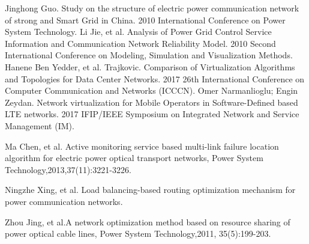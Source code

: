 \documentclass[AMA,STIX1COL]{WileyNJD-v2}
\begin{document}
\begin{thebibliography}{1}
Jinghong Guo. Study on the structure of electric power communication network of strong and Smart Grid in China. 2010 International Conference on Power System Technology.
 Li Jie, et al. Analysis of Power Grid Control Service Information and Communication Network Reliability Model. 2010 Second International Conference on Modeling, Simulation and Visualization Methods.
Hanene Ben Yedder, et al. Trajkovic. Comparison of Virtualization Algorithms and Topologies for Data Center Networks. 2017 26th International Conference on Computer Communication and Networks (ICCCN).
Omer Narmanlioglu; Engin Zeydan. Network virtualization for Mobile Operators in Software-Defined based LTE networks. 2017 IFIP/IEEE Symposium on Integrated Network and Service Management (IM).

Ma Chen, et al. Active monitoring service based multi-link failure location algorithm for electric power optical transport networks, Power System Technology,2013,37(11):3221-3226.

Ningzhe Xing, et al. Load balancing-based routing optimization mechanism for power communication networks.

 Zhou Jing, et al.A network optimization method based on resource sharing of power optical cable lines, Power System Technology,2011, 35(5):199-203.




 \end{thebibliography}

\newpage
 
\end{document}
